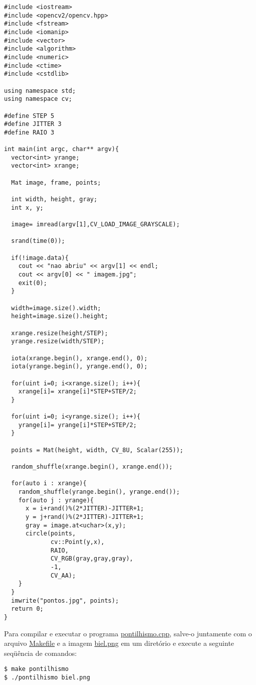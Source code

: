 \documentclass[11pt]{amsbook}
\begin{document}
\begin{verbatim}
#include <iostream>
#include <opencv2/opencv.hpp>
#include <fstream>
#include <iomanip>
#include <vector>
#include <algorithm>
#include <numeric>
#include <ctime>
#include <cstdlib>

using namespace std;
using namespace cv;

#define STEP 5
#define JITTER 3
#define RAIO 3

int main(int argc, char** argv){
  vector<int> yrange;
  vector<int> xrange;

  Mat image, frame, points;

  int width, height, gray;
  int x, y;

  image= imread(argv[1],CV_LOAD_IMAGE_GRAYSCALE);

  srand(time(0));

  if(!image.data){
	cout << "nao abriu" << argv[1] << endl;
    cout << argv[0] << " imagem.jpg";
    exit(0);
  }

  width=image.size().width;
  height=image.size().height;

  xrange.resize(height/STEP);
  yrange.resize(width/STEP);

  iota(xrange.begin(), xrange.end(), 0);
  iota(yrange.begin(), yrange.end(), 0);

  for(uint i=0; i<xrange.size(); i++){
    xrange[i]= xrange[i]*STEP+STEP/2;
  }

  for(uint i=0; i<yrange.size(); i++){
    yrange[i]= yrange[i]*STEP+STEP/2;
  }

  points = Mat(height, width, CV_8U, Scalar(255));

  random_shuffle(xrange.begin(), xrange.end());

  for(auto i : xrange){
    random_shuffle(yrange.begin(), yrange.end());
    for(auto j : yrange){
      x = i+rand()%(2*JITTER)-JITTER+1;
      y = j+rand()%(2*JITTER)-JITTER+1;
      gray = image.at<uchar>(x,y);
      circle(points,
             cv::Point(y,x),
             RAIO,
             CV_RGB(gray,gray,gray),
             -1,
             CV_AA);
    }
  }
  imwrite("pontos.jpg", points);
  return 0;
}
\end{verbatim}

Para compilar e executar o programa
\href{exemplos/pontilhismo.cpp}{pontilhismo.cpp}, salve-o juntamente com
o arquivo \href{exemplos/Makefile}{Makefile} e a imagem
\href{figs/biel.png}{biel.png} em um diretório e execute a seguinte
seqüência de comandos:


\begin{verbatim}
$ make pontilhismo
$ ./pontilhismo biel.png
\end{verbatim}
\end{document}

